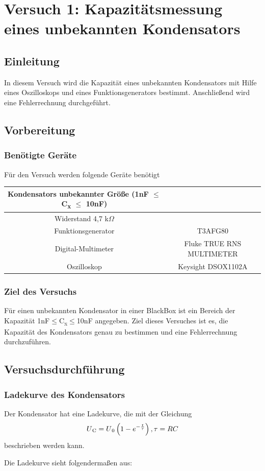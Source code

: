 \chapter{Versuch 1: Kapazitätsmessung eines unbekannten Kondensators}

\section{Einleitung}
In diesem Versuch wird die Kapazität eines unbekannten Kondensators
mit Hilfe eines Oszilloskops und eines Funktionsgenerators bestimmt.
Anschließend wird eine Fehlerrechnung durchgeführt.


\section{Vorbereitung}
\subsection{Benötigte Geräte}

Für den Versuch werden folgende Geräte benötigt

\begin{tabular}[h]{c|c}
    Kondensators unbekannter Größe (1nF $\le$ C\textsubscript{x} $\le$ 10nF) \\
    \hline
    Widerstand 4,7 k$\Omega$& \\
    \hline
    Funktionsgenerator & T3AFG80\\
    \hline
    Digital-Multimeter & Fluke TRUE RNS MULTIMETER\\
    \hline
    Oszilloskop & Keysight DSOX1102A
    \label{tab:Versuch 1: Geräte}
\end{tabular}

\subsection{Ziel des Versuchs}
Für einen unbekannten Kondensator in einer BlackBox ist ein Bereich der Kapazität
1nF$\le$C\textsubscript{x}$\le$10nF angegeben. Ziel dieses Versuches ist es, 
die Kapazität des Kondensators genau zu bestimmen und eine Fehlerrechnung durchzuführen.



\section{Versuchsdurchführung}


\subsection{Ladekurve des Kondensators}
Der Kondensator hat eine Ladekurve, die mit der Gleichung 
\[U\textsubscript{C} = U\textsubscript{0} \left(1 - e^{-\frac{t}{\tau}}\right), \tau=RC\]
beschrieben werden kann.\par
Die Ladekurve sieht folgendermaßen aus: 

